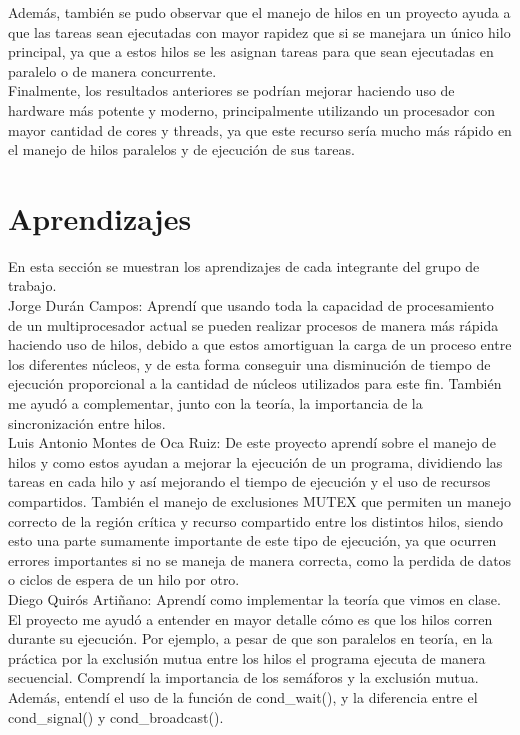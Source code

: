 \documentclass[12pt, article, natbib]{IEEEtran}
\begin{document}
Además, también se pudo observar que el manejo de hilos en un proyecto ayuda a que las tareas sean ejecutadas con mayor rapidez que si se manejara un único hilo principal, ya que a estos hilos se les asignan tareas para que sean ejecutadas en paralelo o de manera concurrente.\cite{portfoliocourses_2022_introduction} \\

Finalmente, los resultados anteriores se podrían mejorar haciendo uso de hardware más potente y moderno, principalmente utilizando un procesador con mayor cantidad de cores y threads, ya que este recurso sería mucho más rápido en el manejo de hilos paralelos y de ejecución de sus tareas.\\

\section{Aprendizajes}
En esta sección se muestran los aprendizajes de cada integrante del grupo de trabajo.\\

Jorge Durán Campos: Aprendí que usando toda la capacidad de procesamiento de un multiprocesador actual se pueden realizar procesos de manera más rápida haciendo uso de hilos, debido a que estos amortiguan la carga de un proceso entre los diferentes núcleos, y de esta forma conseguir una disminución de tiempo de ejecución proporcional a la cantidad de núcleos utilizados para este fin. También me ayudó a complementar, junto con la teoría, la importancia de la sincronización entre hilos.\\

Luis Antonio Montes de Oca Ruiz: De este proyecto aprendí sobre el manejo de hilos y como estos ayudan a mejorar la ejecución de un programa, dividiendo las tareas en cada hilo y así mejorando el tiempo de ejecución y el uso de recursos compartidos. También el manejo de exclusiones MUTEX que permiten un manejo correcto de la región crítica y recurso compartido entre los distintos hilos, siendo esto una parte sumamente importante de este tipo de ejecución, ya que ocurren errores importantes si no se maneja de manera correcta, como la perdida de datos o ciclos de espera de un hilo por otro.\\

Diego Quirós Artiñano: Aprendí como implementar la teoría que vimos en clase. El proyecto me ayudó a entender en mayor detalle cómo es que los hilos corren durante su ejecución. Por ejemplo, a pesar de que son paralelos en teoría, en la práctica por la exclusión mutua entre los hilos el programa ejecuta de manera secuencial. Comprendí la importancia de los semáforos y la exclusión mutua. Además, entendí el uso de la función de cond\_wait(), y la diferencia entre el cond\_signal() y cond\_broadcast().\\

\newpage
\onecolumn
 

\end{document}
